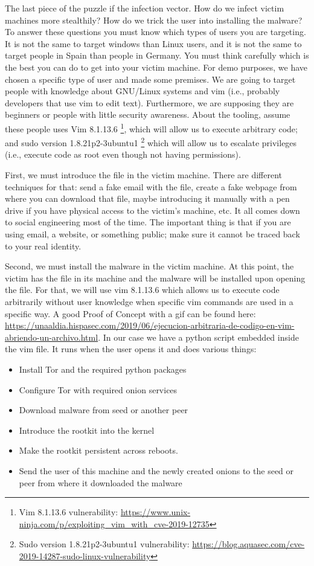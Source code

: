 \documentclass[11pt, a4paper,twoside]{tesi_upf}
\begin{document}
The last piece of the puzzle if the infection vector. How do we infect victim machines more stealthily? How do we trick the user into installing the malware? To answer these questions you must know which types of users you are targeting. It is not the same to target windows than Linux users, and it is not the same to target people in Spain than people in Germany. You must think carefully which is the best you can do to get into your victim machine. For demo purposes, we have chosen a specific type of user and made some premises. We are going to target people with knowledge about GNU/Linux systems and vim (i.e., probably developers that use vim to edit text). Furthermore, we are supposing they are beginners or people with little security awareness. About the tooling, assume these people uses Vim 8.1.13.6 \footnote{Vim 8.1.13.6 vulnerability: \url{https://www.unix-ninja.com/p/exploiting_vim_with_cve-2019-12735}}, which will allow us to execute arbitrary code; and sudo version 1.8.21p2-3ubuntu1 \footnote{Sudo version 1.8.21p2-3ubuntu1 vulnerability: \url{https://blog.aquasec.com/cve-2019-14287-sudo-linux-vulnerability}} which will allow us to escalate privileges (i.e., execute code as root even though not having permissions).

First, we must introduce the file in the victim machine. There are different techniques for that: send a fake email with the file, create a fake webpage from where you can download that file, maybe introducing it manually with a pen drive if you have physical access to the victim's machine, etc. It all comes down to social engineering most of the time. The important thing is that if you are using email, a website, or something public; make sure it cannot be traced back to your real identity.

Second, we must install the malware in the victim machine. At this point, the victim has the file in its machine and the malware will be installed upon opening the file. For that, we will use vim 8.1.13.6 which allows us to execute code arbitrarily without user knowledge when specific vim commands are used in a specific way. A good Proof of Concept with a gif can be found here: \url{https://unaaldia.hispasec.com/2019/06/ejecucion-arbitraria-de-codigo-en-vim-abriendo-un-archivo.html}. In our case we have a python script embedded inside the vim file. It runs when the user opens it and does various things:
\begin{itemize}
    \item Install Tor and the required python packages
    \item Configure Tor with required onion services
    \item Download malware from seed or another peer
    \item Introduce the rootkit into the kernel
    \item Make the rootkit persistent across reboots.
    \item Send the user of this machine and the newly created onions to the seed or peer from where it downloaded the malware
\end{itemize}
\end{document}
